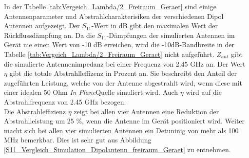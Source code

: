 In der Tabelle \ref{tab:Vergeich_Lambda/2_Freiraum_Geraet} sind einige Antennenparameter und Abstrahlcharakterisiken der verschiedenen Dipol Antennen aufgezeigt. Der $S_{11}$-Wert in dB gibt den maximalen Wert der Rückflussdämpfung an. Da die $S_{11}$-Dämpfungen der simulierten Antennen im Gerät  nie einen Wert von -10 dB erreichen, wird die -10dB-Bandbreite in der Tabelle \ref{tab:Vergeich_Lambda/2_Freiraum_Geraet} nicht aufgeführt.
$Z_{ant}$ gibt die simulierte Antennenimpedanz bei einer Frequenz von 2.45 GHz an.
Der Wert $\eta$ gibt die totale Abstrahlleffizenz in Prozent an. 
Sie beschreibt den Anteil der zugeführten Leistung, welche von der Antenne abgestrahlt wird, wenn diese mit einer idealen 50 Ohm \textit{In Plane}Quelle simuliert wird. 
%
Auch $\eta$ wird auf die Abstrahlfrequenz von 2.45 GHz bezogen.\\
Die Abstrahleffizienz $\eta$ zeigt bei allen vier Antennen eine Reduktion der Abstrahlleistung um 25 $\%$, wenn die Antenne im Gerät positioniert wird. Weiter macht sich bei allen vier simulierten Antennen ein Detuninig von mehr als 100 MHz bemerkbar. Dies ist sehr gut aus Abbildung \ref{S11_Vergleich_Simulation_Dipolantenn_freiraum_Geraet} zu entnehmen. 



